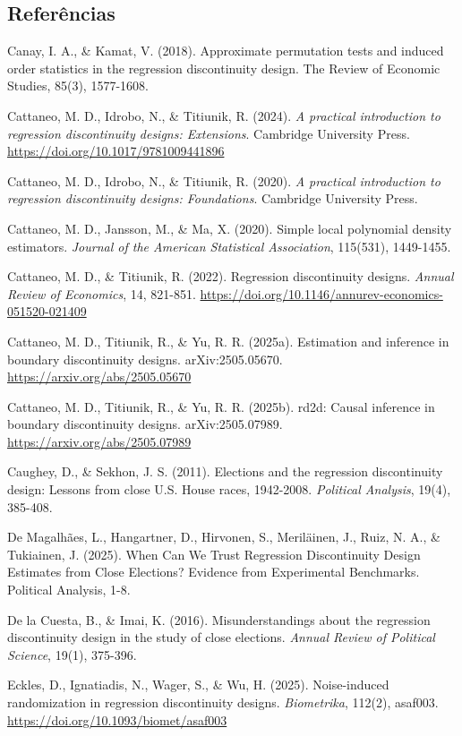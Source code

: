 \documentclass[
]{article}
\begin{document}
\subsection{Referências}\label{referuxeancias-1}

Canay, I. A., \& Kamat, V. (2018). Approximate permutation tests and induced order statistics in the regression discontinuity design. The Review of Economic Studies, 85(3), 1577-1608.

Cattaneo, M. D., Idrobo, N., \& Titiunik, R. (2024). \emph{A practical introduction to regression discontinuity designs: Extensions}. Cambridge University Press. \url{https://doi.org/10.1017/9781009441896}

Cattaneo, M. D., Idrobo, N., \& Titiunik, R. (2020). \emph{A practical introduction to regression discontinuity designs: Foundations}. Cambridge University Press.

Cattaneo, M. D., Jansson, M., \& Ma, X. (2020). Simple local polynomial density estimators. \emph{Journal of the American Statistical Association}, 115(531), 1449-1455.

Cattaneo, M. D., \& Titiunik, R. (2022). Regression discontinuity designs. \emph{Annual Review of Economics}, 14, 821-851. \url{https://doi.org/10.1146/annurev-economics-051520-021409}

Cattaneo, M. D., Titiunik, R., \& Yu, R. R. (2025a). Estimation and inference in boundary discontinuity designs. arXiv:2505.05670. \url{https://arxiv.org/abs/2505.05670}

Cattaneo, M. D., Titiunik, R., \& Yu, R. R. (2025b). rd2d: Causal inference in boundary discontinuity designs. arXiv:2505.07989. \url{https://arxiv.org/abs/2505.07989}

Caughey, D., \& Sekhon, J. S. (2011). Elections and the regression discontinuity design: Lessons from close U.S. House races, 1942-2008. \emph{Political Analysis}, 19(4), 385-408.

De Magalhães, L., Hangartner, D., Hirvonen, S., Meriläinen, J., Ruiz, N. A., \& Tukiainen, J. (2025). When Can We Trust Regression Discontinuity Design Estimates from Close Elections? Evidence from Experimental Benchmarks. Political Analysis, 1-8.

De la Cuesta, B., \& Imai, K. (2016). Misunderstandings about the regression discontinuity design in the study of close elections. \emph{Annual Review of Political Science}, 19(1), 375-396.

Eckles, D., Ignatiadis, N., Wager, S., \& Wu, H. (2025). Noise-induced randomization in regression discontinuity designs. \emph{Biometrika}, 112(2), asaf003. \url{https://doi.org/10.1093/biomet/asaf003}
\end{document}
